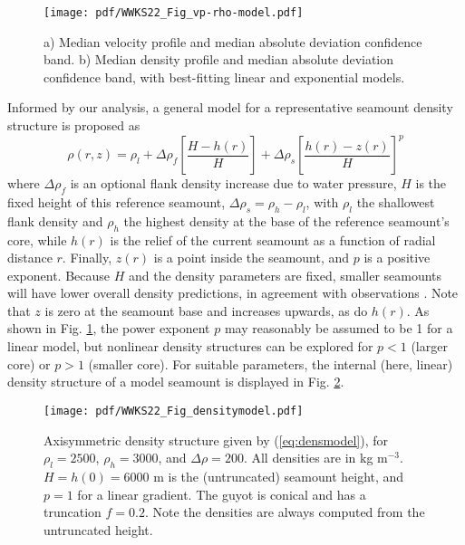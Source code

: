 \begin{figure}[h]
\centering
\texttt{[image: pdf/WWKS22\_Fig\_vp-rho-model.pdf]}
\caption{a) Median velocity profile and median absolute deviation confidence band. b) Median density
profile and median absolute deviation confidence band, with best-fitting linear and exponential models.}
\label{WWKS22_Fig_vp-rho-model}
\end{figure}

Informed by our analysis, a general model for a representative seamount density structure is proposed as
\begin{equation}
\rho(r,z) = \rho_l + \Delta \rho_f \left [\frac{H-h(r)}{H}\right ] + \Delta \rho_s \left [ \frac{h(r)-z(r)}{H} \right ]^p
\label{eq:densmodel}
\end{equation}
where $\Delta \rho_f$ is an optional flank density increase due to water pressure, $H$ is the fixed height
of this reference seamount, $\Delta \rho_s = \rho_h - \rho_l$, with $\rho_l$ the shallowest flank density and
$\rho_h$ the highest density at the base of the reference seamount's core, while $h(r)$ is the relief of
the current seamount as a function of radial distance $r$. Finally, $z(r)$ is a point inside the seamount, and $p$ is a
positive exponent.  Because $H$ and the density parameters are fixed, smaller seamounts will have lower overall
density predictions, in agreement with observations \citep{H1991}. Note that $z$ is zero at the seamount base and increases
upwards, as do $h(r)$. As shown in Fig. \ref{WWKS22_Fig_vp-rho-model},
the power exponent $p$ may reasonably be assumed to be 1 for a linear model, but nonlinear density structures
can be explored for $p < 1$ (larger core) or $p > 1$ (smaller core). For suitable parameters, the internal (here, linear)
density structure of a model seamount is displayed in Fig. \ref{WWKS22_Fig_densitymodel}.

\begin{figure}[h]
\centering
\texttt{[image: pdf/WWKS22\_Fig\_densitymodel.pdf]}
\caption{Axisymmetric density structure given by (\ref{eq:densmodel}), for $\rho_l = 2500$, $\rho_h = 3000$,
and $\Delta \rho = 200$. All densities are in kg m$^{-3}$. $H = h(0) = 6000$ m is the (untruncated) seamount height,
and $p = 1$ for a linear gradient. The guyot is conical and has a truncation $f = 0.2$.  Note the densities are
always computed from the untruncated height.}
\label{WWKS22_Fig_densitymodel}
\end{figure}

